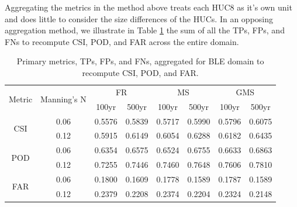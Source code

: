 Aggregating the metrics in the method above treats each HUC8 as it's own unit and does little to consider the size differences of the HUCs. 
In an opposing aggregation method, we illustrate in Table \ref{tab:aggregate_metrics} the sum of all the TPs, FPs, and FNs to recompute CSI, POD, and FAR across the entire domain. 
%
\begin{table}[h!]
\caption{Primary metrics, TPs, FPs, and FNs, aggregated for BLE domain to recompute CSI, POD, and FAR.}
\label{tab:aggregate_metrics}
\centering
\begin{tabular}{|c|c||c|c|c|c|c|c|}
\hline
\multirow{2}{*}{Metric} & \multirow{2}{*}{Manning's N} & \multicolumn{2}{|c|}{FR} & \multicolumn{2}{|c|}{MS} & \multicolumn{2}{|c|}{GMS} \\
\cline{3-8}
  &  & 100yr & 500yr & 100yr & 500yr & 100yr & 500yr \\
\hline
\multirow{2}{*}{CSI} & 0.06 & 0.5576 & 0.5839 & 0.5717 & 0.5990 & 0.5796 & 0.6075 \\
\cline{2-8}
  & 0.12 & 0.5915 & 0.6149 & 0.6054 & 0.6288 & 0.6182 & 0.6435 \\
\hline
\multirow{2}{*}{POD} & 0.06 & 0.6354 & 0.6575 & 0.6524 & 0.6755 & 0.6633 & 0.6863 \\
\cline{2-8}
  & 0.12 & 0.7255 & 0.7446 & 0.7460 & 0.7648 & 0.7606 & 0.7810 \\
\hline
\multirow{2}{*}{FAR} & 0.06 & 0.1800 & 0.1609 & 0.1778 & 0.1589 & 0.1787 & 0.1589 \\
\cline{2-8}
  & 0.12 & 0.2379 & 0.2208 & 0.2374 & 0.2204 & 0.2324 & 0.2148 \\
\hline
\end{tabular}
\end{table}
%
